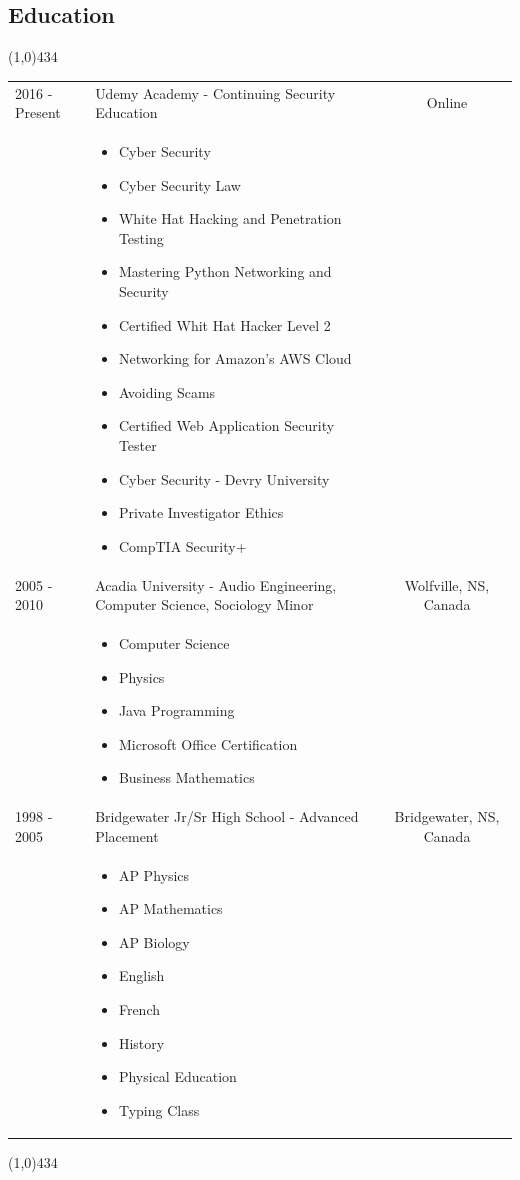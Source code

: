 \documentclass{res}
\newcommand{\frstCVcell}{2.5cm}
\begin{document}
\begin{resume}
  \section{Education}
  \line(1,0){434}
  \newline
  \newline
  \begin{tabularx}{\textwidth}{p{\frstCVcell}Xc}
    2016 - Present & Udemy Academy - Continuing Security Education & Online\\
    &
    \begin{itemize}
    \item Cyber Security
    \item Cyber Security Law
    \item White Hat Hacking and Penetration Testing
    \item Mastering Python Networking and Security
    \item Certified Whit Hat Hacker Level 2
    \item Networking for Amazon's AWS Cloud
    \item Avoiding Scams
    \item Certified Web Application Security Tester
    \item Cyber Security - Devry University
    \item Private Investigator Ethics
    \item CompTIA Security+
    \end{itemize}
    & \\
    2005 - 2010 & Acadia University - Audio Engineering, Computer Science, Sociology Minor & Wolfville, NS, Canada\\
    &
    \begin{itemize}
    \item Computer Science
    \item Physics
    \item Java Programming
    \item Microsoft Office Certification
    \item Business Mathematics
    \end{itemize}
    & \\
    1998 - 2005 & Bridgewater Jr/Sr High School - Advanced Placement & Bridgewater, NS, Canada\\
    &
    \begin{itemize}
    \item AP Physics
    \item AP Mathematics
    \item AP Biology
    \item English
    \item French
    \item History
    \item Physical Education
    \item Typing Class
    \end{itemize}
    & \\
  \end{tabularx}
  \newline
  \line(1,0){434}


\end{resume}
\end{document}
